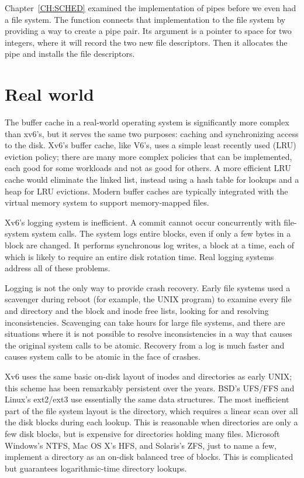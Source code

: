 Chapter~\ref{CH:SCHED} examined the implementation of pipes
before we even had a file system.
The function
connects that implementation to the file system
by providing a way to create a pipe pair.
Its argument is a pointer to space for two integers,
where it will record the two new file descriptors.
Then it allocates the pipe and installs the file descriptors.
\section{Real world}

The buffer cache in a real-world operating system is significantly
more complex than xv6's, but it serves the same two purposes:
caching and synchronizing access to the disk.
Xv6's buffer cache, like V6's, uses a simple least recently used (LRU)
eviction policy; there are many more complex
policies that can be implemented, each good for some
workloads and not as good for others.
A more efficient LRU cache would eliminate the linked list,
instead using a hash table for lookups and a heap for LRU evictions.
Modern buffer caches are typically integrated with the
virtual memory system to support memory-mapped files.

Xv6's logging system is inefficient.
A commit cannot occur concurrently with file-system system calls.
The system logs entire blocks, even if
only a few bytes in a block are changed. It performs synchronous
log writes, a block at a time, each of which is likely to require an
entire disk rotation time. Real logging systems address all of these
problems.

Logging is not the only way to provide crash recovery. Early file systems
used a scavenger during reboot (for example, the UNIX
program) to examine every file and directory and the block and inode
free lists, looking for and resolving inconsistencies. Scavenging can take
hours for large file systems, and there are situations where it is not
possible to resolve inconsistencies in a way that causes the original
system calls to be atomic. Recovery
from a log is much faster and causes system calls to be atomic
in the face of crashes.

Xv6 uses the same basic on-disk layout of inodes and directories
as early UNIX;
this scheme has been remarkably persistent over the years.
BSD's UFS/FFS and Linux's ext2/ext3 use essentially the same data structures.
The most inefficient part of the file system layout is the directory,
which requires a linear scan over all the disk blocks during each lookup.
This is reasonable when directories are only a few disk blocks,
but is expensive for directories holding many files.
Microsoft Windows's NTFS, Mac OS X's HFS, and Solaris's ZFS, just to name a few, implement
a directory as an on-disk balanced tree of blocks.
This is complicated but guarantees logarithmic-time directory lookups.

